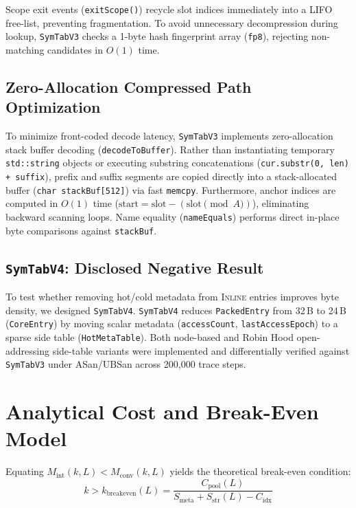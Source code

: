 \documentclass[conference]{IEEEtran}
\begin{document}
Scope exit events (\texttt{exitScope()}) recycle slot indices immediately into a LIFO free-list, preventing fragmentation. To avoid unnecessary decompression during lookup, \texttt{SymTabV3} checks a 1-byte hash fingerprint array (\texttt{fp8}), rejecting non-matching candidates in $O(1)$ time.

\subsection{Zero-Allocation Compressed Path Optimization}
To minimize front-coded decode latency, \texttt{SymTabV3} implements zero-allocation stack buffer decoding (\texttt{decodeToBuffer}). Rather than instantiating temporary \texttt{std::string} objects or executing substring concatenations (\texttt{cur.substr(0, len) + suffix}), prefix and suffix segments are copied directly into a stack-allocated buffer (\texttt{char stackBuf[512]}) via fast \texttt{memcpy}. Furthermore, anchor indices are computed in $O(1)$ time ($\text{start} = \text{slot} - (\text{slot} \pmod A)$), eliminating backward scanning loops. Name equality (\texttt{nameEquals}) performs direct in-place byte comparisons against \texttt{stackBuf}.

\subsection{\texttt{SymTabV4}: Disclosed Negative Result}
To test whether removing hot/cold metadata from \textsc{Inline} entries improves byte density, we designed \texttt{SymTabV4}. \texttt{SymTabV4} reduces \texttt{PackedEntry} from 32\,B to 24\,B (\texttt{CoreEntry}) by moving scalar metadata (\texttt{accessCount}, \texttt{lastAccessEpoch}) to a sparse side table (\texttt{HotMetaTable}). Both node-based and Robin Hood open-addressing side-table variants were implemented and differentially verified against \texttt{SymTabV3} under ASan/UBSan across 200,000 trace steps.

\section{Analytical Cost and Break-Even Model}

Equating $M_{\text{int}}(k, L) < M_{\text{conv}}(k, L)$ yields the theoretical break-even condition:
\begin{equation}
k > k_{\text{breakeven}}(L) = \frac{C_{\text{pool}}(L)}{S_{\text{meta}} + S_{\text{str}}(L) - C_{\text{idx}}}
\end{equation}
\end{document}
